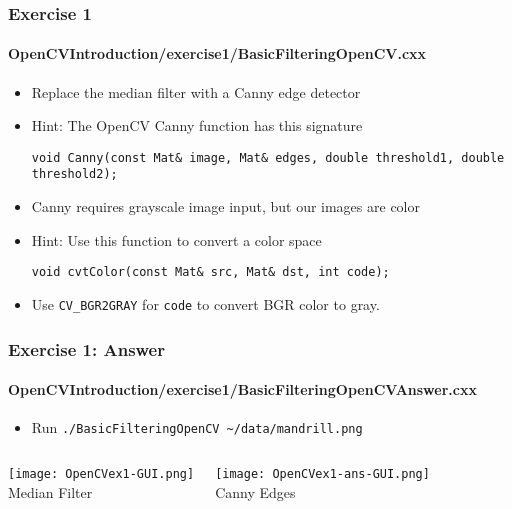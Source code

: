\begin{frame}[fragile]
\frametitle{Exercise 1}
\framesubtitle{OpenCVIntroduction/exercise1/BasicFilteringOpenCV.cxx}
\begin{center}
\begin{itemize}
\item Replace the median filter with a Canny edge detector
\pause
\item Hint: The OpenCV Canny function has this signature
\begin{lstlisting}[numbers=none,xleftmargin=0pt]
void Canny(const Mat& image, Mat& edges, double threshold1, double threshold2);
\end{lstlisting}
\pause
\item Canny requires grayscale image input, but our images are color
\item Hint: Use this function to convert a color space
\begin{lstlisting}[numbers=none,xleftmargin=0pt]
void cvtColor(const Mat& src, Mat& dst, int code);
\end{lstlisting}
\item Use {\tt CV\_BGR2GRAY} for {\tt code} to convert BGR color to gray.
\end{itemize}
\end{center}
\end{frame}


\begin{frame}[fragile]
\frametitle{Exercise 1: Answer}
\framesubtitle{OpenCVIntroduction/exercise1/BasicFilteringOpenCVAnswer.cxx}
\begin{center}
\begin{itemize}
\item Run \verb|./BasicFilteringOpenCV ~/data/mandrill.png|
\end{itemize}
\pause
\begin{columns}[c]
\begin{center}
\texttt{[image: OpenCVex1-GUI.png]} \\
Median Filter
\end{center}
\begin{center}
\texttt{[image: OpenCVex1-ans-GUI.png]} \\
Canny Edges
\end{center}
\end{columns}
\end{center}
\end{frame}


